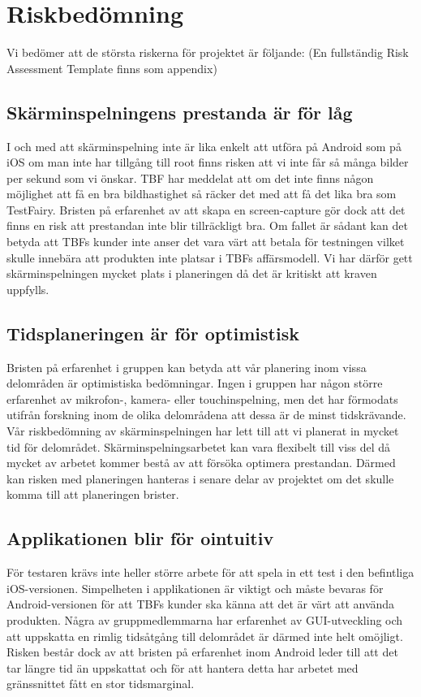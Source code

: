 \section{Riskbedömning}

Vi bedömer att de största riskerna för projektet är följande:
(En fullständig Risk Assessment Template finns som appendix)

\subsection{Skärminspelningens prestanda är för låg}
\label{subsec:screenrec}
I och med att skärminspelning inte är lika enkelt att utföra på Android som på iOS om man inte har tillgång till root finns risken att vi inte får så många bilder per sekund som vi önskar. TBF har meddelat att om det inte finns någon möjlighet att få en bra bildhastighet så räcker det med att få det lika bra som TestFairy. Bristen på erfarenhet av att skapa en screen-capture gör dock att det finns en risk att prestandan inte blir tillräckligt bra. Om fallet är sådant kan det betyda att TBFs kunder inte anser det vara värt att betala för testningen vilket skulle innebära att produkten inte platsar i TBFs affärsmodell. Vi har därför gett skärminspelningen mycket plats i planeringen då det är kritiskt att kraven uppfylls.

\subsection{Tidsplaneringen är för optimistisk}
Bristen på erfarenhet i gruppen kan betyda att vår planering inom vissa delområden är optimistiska bedömningar. Ingen i gruppen har någon större erfarenhet av mikrofon-, kamera- eller touchinspelning, men det har förmodats utifrån forskning inom de olika delområdena att dessa är de minst tidskrävande. Vår riskbedömning av skärminspelningen har lett till att vi planerat in mycket tid för delområdet. Skärminspelningsarbetet kan vara flexibelt till viss del då mycket av arbetet kommer bestå av att försöka optimera prestandan. Därmed kan risken med planeringen hanteras i senare delar av projektet om det skulle komma till att planeringen brister.

\subsection{Applikationen blir för ointuitiv}
För testaren krävs inte heller större arbete för att spela in ett test i den befintliga iOS-versionen. Simpelheten i applikationen är viktigt och måste bevaras för Android-versionen för att TBFs kunder ska känna att det är värt att använda produkten. Några av gruppmedlemmarna har erfarenhet av GUI-utveckling och att uppskatta en rimlig tidsåtgång till delområdet är därmed inte helt omöjligt. Risken består dock av att bristen på erfarenhet inom Android leder till att det tar längre tid än uppskattat och för att hantera detta har arbetet med gränssnittet fått en stor tidsmarginal.

